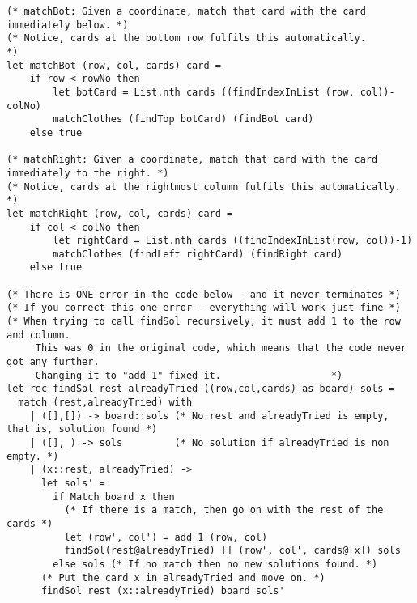 \begin{lstlisting}
(* matchBot: Given a coordinate, match that card with the card immediately below. *)
(* Notice, cards at the bottom row fulfils this automatically.                    *)
let matchBot (row, col, cards) card = 
    if row < rowNo then
        let botCard = List.nth cards ((findIndexInList (row, col))-colNo)
        matchClothes (findTop botCard) (findBot card)
    else true

(* matchRight: Given a coordinate, match that card with the card immediately to the right. *)
(* Notice, cards at the rightmost column fulfils this automatically.                       *)
let matchRight (row, col, cards) card =
    if col < colNo then
        let rightCard = List.nth cards ((findIndexInList(row, col))-1)
        matchClothes (findLeft rightCard) (findRight card)
    else true

(* There is ONE error in the code below - and it never terminates *)
(* If you correct this one error - everything will work just fine *)
(* When trying to call findSol recursively, it must add 1 to the row and column.
     This was 0 in the original code, which means that the code never got any further. 
     Changing it to "add 1" fixed it.                   *)
let rec findSol rest alreadyTried ((row,col,cards) as board) sols =
  match (rest,alreadyTried) with
    | ([],[]) -> board::sols (* No rest and alreadyTried is empty, that is, solution found *)
    | ([],_) -> sols         (* No solution if alreadyTried is non empty. *)
    | (x::rest, alreadyTried) ->
      let sols' = 
        if Match board x then
          (* If there is a match, then go on with the rest of the cards *)
          let (row', col') = add 1 (row, col)
          findSol(rest@alreadyTried) [] (row', col', cards@[x]) sols
        else sols (* If no match then no new solutions found. *)
      (* Put the card x in alreadyTried and move on. *)
      findSol rest (x::alreadyTried) board sols'
\end{lstlisting}